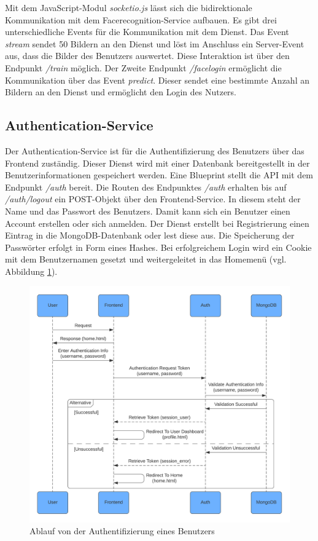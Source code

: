 Mit dem JavaScript-Modul \textit{socketio.js} lässt sich die bidirektionale Kommunikation mit dem Facerecognition-Service aufbauen.
Es gibt drei unterschiedliche Events für die Kommunikation mit dem Dienst.
Das Event \textit{stream} sendet 50 Bildern an den Dienst und löst im Anschluss ein Server-Event aus, dass die Bilder des Benutzers auswertet.
Diese Interaktion ist über den Endpunkt \textit{/train} möglich.
Der Zweite Endpunkt \textit{/facelogin} ermöglicht die Kommunikation über das Event \textit{predict}.
Dieser sendet eine bestimmte Anzahl an Bildern an den Dienst und ermöglicht den Login des Nutzers.


\subsection{Authentication-Service}
Der Authentication-Service ist für die Authentifizierung des Benutzers über das Frontend zuständig.
Dieser Dienst wird mit einer Datenbank bereitgestellt in der Benutzerinformationen gespeichert werden.
Eine Blueprint stellt die API mit dem Endpunkt \textit{/auth} bereit.
Die Routen des Endpunktes \textit{/auth} erhalten bis auf \textit{/auth/logout} ein POST-Objekt über den Frontend-Service.
In diesem steht der Name und das Passwort des Benutzers.
Damit kann sich ein Benutzer einen Account erstellen oder sich anmelden.
Der Dienst erstellt bei Registrierung einen Eintrag in die MongoDB-Datenbank oder lest diese aus.
Die Speicherung der Passwörter erfolgt in Form eines Hashes.
Bei erfolgreichem Login wird ein Cookie mit dem Benutzernamen gesetzt und weitergeleitet in das Homemenü (vgl. Abbildung \ref{fig:authenticationsequence}).

\begin{figure}[!htb]
  \centering
  \includegraphics[width=1.0\columnwidth]{images/UMLAuthenticationService.png}
  \caption{Ablauf von der Authentifizierung eines Benutzers}
  \label{fig:authenticationsequence}
\end{figure}


